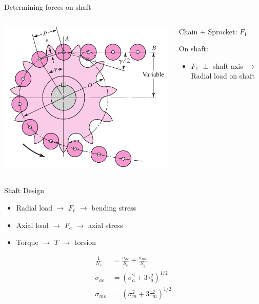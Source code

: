 \documentclass[10pt, svgnames]{beamer}
\begin{document}
\begin{frame}[label={sec:org84e7535}]{Determining forces on shaft}
\begin{columns}
\begin{column}{0.5\columnwidth}
\begin{center}
\includegraphics[width=.9\linewidth]{./pictures/chordal-speed-variation.png}
\end{center}
\end{column}

\begin{column}{0.5\columnwidth}
Chain + Sprocket: \(F_{1}\)

On shaft:

\begin{itemize}
\item \(F_{1}\) \(\perp\) shaft axis \(\rightarrow\) Radial load on shaft
\end{itemize}
\end{column}
\end{columns}
\end{frame}

\begin{frame}[label={sec:orgac13e38}]{Shaft Design}
\begin{itemize}
\item Radial load \(\rightarrow\) \(F_{r}\) \(\rightarrow\) bending stress
\item Axial load \(\rightarrow\) \(F_{a}\) \(\rightarrow\) axial stress
\item Torque \(\rightarrow\) \(T\) \(\rightarrow\) torsion
\end{itemize}

\begin{align*}
  \frac{1}{N_{s}} &= \frac{\sigma_{ae}}{S_{e}} + \frac{\sigma_{me}}{S_{y}} \\
  \sigma_{ae} &= \left( \sigma_{a}^{2} + 3 \tau_{a}^{2} \right)^{1/2} \\
  \sigma_{me} &= \left( \sigma_{m}^{2} + 3 \tau_{m}^{2} \right)^{1/2}
\end{align*}
\end{frame}
\end{document}
